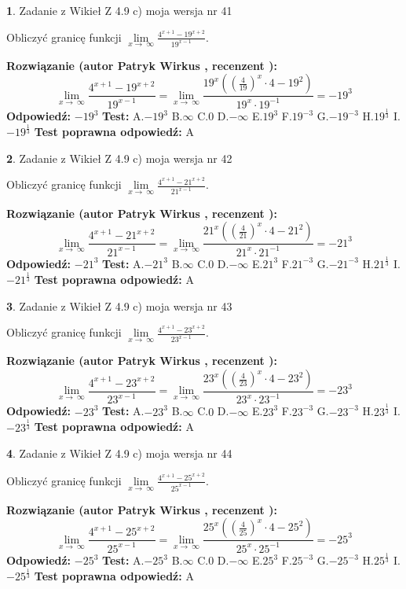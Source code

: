 \documentclass[12pt, a4paper]{article}
\theoremstyle{definition} %
\newtheorem{zad}{}
\newcommand{\zadStart}[1]{\begin{zad}#1\newline}
\newcommand{\zadStop}{\end{zad}}
\newcommand{\rozwStart}[2]{\noindent \textbf{Rozwiązanie (autor #1 , recenzent #2): }\newline}
\newcommand{\rozwStop}{\newline}
\newcommand{\odpStart}{\noindent \textbf{Odpowiedź:}\newline}
\newcommand{\odpStop}{\newline}
\newcommand{\testStart}{\noindent \textbf{Test:}\newline}
\newcommand{\testStop}{\newline}
\newcommand{\kluczStart}{\noindent \textbf{Test poprawna odpowiedź:}\newline}
\newcommand{\kluczStop}{\newline}
\begin{document}
\zadStart{Zadanie z Wikieł Z 4.9 c) moja wersja nr 41}


Obliczyć granicę funkcji  $\lim\limits_{x\to\ \infty}\frac{4^{x+1}-19^{x+2}}{19^{x-1}}$.
\zadStop
\rozwStart{Patryk Wirkus}{}
$$\lim\limits_{x\to\ \infty}\frac{4^{x+1}-19^{x+2}}{19^{x-1}}=\lim\limits_{x\to\ \infty}\frac{19^{x}((\frac{4}{19})^{x}\cdot 4 -19^{2})}{19^{x}\cdot 19^{-1}} = -19^{3}$$
\rozwStop
\odpStart
$-19^{3}$
\odpStop
\testStart
A.$-19^{3}$ B.$\infty$ C.$0$ D.$-\infty$ E.$19^{3}$
F.$19^{-3}$ G.$-19^{-3}$
H.$19^{\frac{1}{3}}$
I.$-19^{\frac{1}{3}}$
\testStop
\kluczStart
A
\kluczStop



\zadStart{Zadanie z Wikieł Z 4.9 c) moja wersja nr 42}


Obliczyć granicę funkcji  $\lim\limits_{x\to\ \infty}\frac{4^{x+1}-21^{x+2}}{21^{x-1}}$.
\zadStop
\rozwStart{Patryk Wirkus}{}
$$\lim\limits_{x\to\ \infty}\frac{4^{x+1}-21^{x+2}}{21^{x-1}}=\lim\limits_{x\to\ \infty}\frac{21^{x}((\frac{4}{21})^{x}\cdot 4 -21^{2})}{21^{x}\cdot 21^{-1}} = -21^{3}$$
\rozwStop
\odpStart
$-21^{3}$
\odpStop
\testStart
A.$-21^{3}$ B.$\infty$ C.$0$ D.$-\infty$ E.$21^{3}$
F.$21^{-3}$ G.$-21^{-3}$
H.$21^{\frac{1}{3}}$
I.$-21^{\frac{1}{3}}$
\testStop
\kluczStart
A
\kluczStop



\zadStart{Zadanie z Wikieł Z 4.9 c) moja wersja nr 43}


Obliczyć granicę funkcji  $\lim\limits_{x\to\ \infty}\frac{4^{x+1}-23^{x+2}}{23^{x-1}}$.
\zadStop
\rozwStart{Patryk Wirkus}{}
$$\lim\limits_{x\to\ \infty}\frac{4^{x+1}-23^{x+2}}{23^{x-1}}=\lim\limits_{x\to\ \infty}\frac{23^{x}((\frac{4}{23})^{x}\cdot 4 -23^{2})}{23^{x}\cdot 23^{-1}} = -23^{3}$$
\rozwStop
\odpStart
$-23^{3}$
\odpStop
\testStart
A.$-23^{3}$ B.$\infty$ C.$0$ D.$-\infty$ E.$23^{3}$
F.$23^{-3}$ G.$-23^{-3}$
H.$23^{\frac{1}{3}}$
I.$-23^{\frac{1}{3}}$
\testStop
\kluczStart
A
\kluczStop



\zadStart{Zadanie z Wikieł Z 4.9 c) moja wersja nr 44}


Obliczyć granicę funkcji  $\lim\limits_{x\to\ \infty}\frac{4^{x+1}-25^{x+2}}{25^{x-1}}$.
\zadStop
\rozwStart{Patryk Wirkus}{}
$$\lim\limits_{x\to\ \infty}\frac{4^{x+1}-25^{x+2}}{25^{x-1}}=\lim\limits_{x\to\ \infty}\frac{25^{x}((\frac{4}{25})^{x}\cdot 4 -25^{2})}{25^{x}\cdot 25^{-1}} = -25^{3}$$
\rozwStop
\odpStart
$-25^{3}$
\odpStop
\testStart
A.$-25^{3}$ B.$\infty$ C.$0$ D.$-\infty$ E.$25^{3}$
F.$25^{-3}$ G.$-25^{-3}$
H.$25^{\frac{1}{3}}$
I.$-25^{\frac{1}{3}}$
\testStop
\kluczStart
A
\kluczStop
\end{document}

